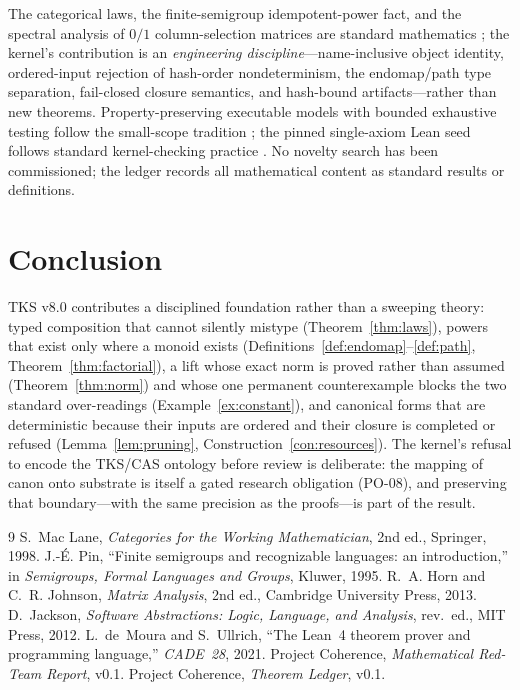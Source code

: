 \documentclass[11pt]{amsart}
\theoremstyle{definition}
\theoremstyle{remark}
\begin{document}
The categorical laws, the finite-semigroup idempotent-power fact, and the spectral analysis of $0/1$ column-selection matrices are standard mathematics \cite{maclane,pin,horn}; the kernel's contribution is an \emph{engineering discipline}---name-inclusive object identity, ordered-input rejection of hash-order nondeterminism, the endomap/path type separation, fail-closed closure semantics, and hash-bound artifacts---rather than new theorems. Property-preserving executable models with bounded exhaustive testing follow the small-scope tradition \cite{jackson}; the pinned single-axiom Lean seed follows standard kernel-checking practice \cite{lean4}. No novelty search has been commissioned; the ledger records all mathematical content as standard results or definitions.

\section{Conclusion}

TKS v8.0 contributes a disciplined foundation rather than a sweeping theory: typed composition that cannot silently mistype (Theorem~\ref{thm:laws}), powers that exist only where a monoid exists (Definitions~\ref{def:endomap}--\ref{def:path}, Theorem~\ref{thm:factorial}), a lift whose exact norm is proved rather than assumed (Theorem~\ref{thm:norm}) and whose one permanent counterexample blocks the two standard over-readings (Example~\ref{ex:constant}), and canonical forms that are deterministic because their inputs are ordered and their closure is completed or refused (Lemma~\ref{lem:pruning}, Construction~\ref{con:resources}). The kernel's refusal to encode the TKS/CAS ontology before review is deliberate: the mapping of canon onto substrate is itself a gated research obligation (PO-08), and preserving that boundary---with the same precision as the proofs---is part of the result.

\begin{thebibliography}{9}
 S.~Mac Lane, \emph{Categories for the Working Mathematician}, 2nd ed., Springer, 1998.
 J.-\'E. Pin, ``Finite semigroups and recognizable languages: an introduction,'' in \emph{Semigroups, Formal Languages and Groups}, Kluwer, 1995.
 R.~A. Horn and C.~R. Johnson, \emph{Matrix Analysis}, 2nd ed., Cambridge University Press, 2013.
 D.~Jackson, \emph{Software Abstractions: Logic, Language, and Analysis}, rev.\ ed., MIT Press, 2012.
 L.~de~Moura and S.~Ullrich, ``The Lean~4 theorem prover and programming language,'' \emph{CADE~28}, 2021.
 Project Coherence, \emph{Mathematical Red-Team Report}, v0.1.
 Project Coherence, \emph{Theorem Ledger}, v0.1.
\end{thebibliography}
\end{document}
